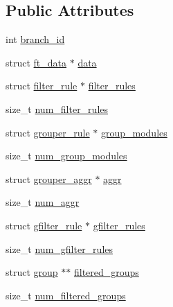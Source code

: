 \subsection*{\-Public \-Attributes}
\begin{DoxyCompactItemize}
\item 
int \hyperlink{structbranch__info_a6cbcf2bcb1c568d814ed65d44d3863f3}{branch\-\_\-id}
\item 
struct \hyperlink{structft__data}{ft\-\_\-data} $\ast$ \hyperlink{structbranch__info_a349eec62cfbb3890aa0610e0d983f3b1}{data}
\item 
struct \hyperlink{structfilter__rule}{filter\-\_\-rule} $\ast$ \hyperlink{structbranch__info_a7e37880a544c6af0c068187b80ec3215}{filter\-\_\-rules}
\item 
size\-\_\-t \hyperlink{structbranch__info_ad375459bf2bd609517c0927826878cdf}{num\-\_\-filter\-\_\-rules}
\item 
struct \hyperlink{structgrouper__rule}{grouper\-\_\-rule} $\ast$ \hyperlink{structbranch__info_a36d8f1bdb8c8fa4dafe7292b885ac066}{group\-\_\-modules}
\item 
size\-\_\-t \hyperlink{structbranch__info_a55739e63096133c35770d4301e0b1707}{num\-\_\-group\-\_\-modules}
\item 
struct \hyperlink{structgrouper__aggr}{grouper\-\_\-aggr} $\ast$ \hyperlink{structbranch__info_a1248264340222f00113692e6692d1ee7}{aggr}
\item 
size\-\_\-t \hyperlink{structbranch__info_a6d6ce4f15c0bf68d3ae10a23877de8c1}{num\-\_\-aggr}
\item 
struct \hyperlink{structgfilter__rule}{gfilter\-\_\-rule} $\ast$ \hyperlink{structbranch__info_a93bb8a42b423d6b1215f416f466f583d}{gfilter\-\_\-rules}
\item 
size\-\_\-t \hyperlink{structbranch__info_ad65fbdeee3c34759d28a42fb653ddd19}{num\-\_\-gfilter\-\_\-rules}
\item 
struct \hyperlink{structgroup}{group} $\ast$$\ast$ \hyperlink{structbranch__info_a4645514f5b85b8acdedebc78998a11d4}{filtered\-\_\-groups}
\item 
size\-\_\-t \hyperlink{structbranch__info_a2a8dfe3330c889d7be215c3bbbeef43a}{num\-\_\-filtered\-\_\-groups}
\end{DoxyCompactItemize}


